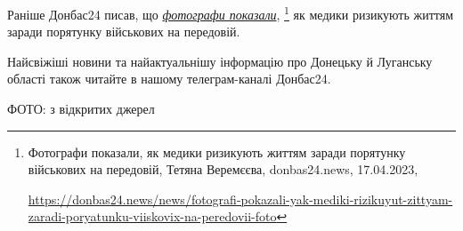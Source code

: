 Раніше Донбас24 писав, що \href{https://donbas24.news/news/fotografi-pokazali-yak-mediki-rizikuyut-zittyam-zaradi-poryatunku-viiskovix-na-peredovii-foto}{\emph{фотографи показали}},%
\footnote{Фотографи показали, як медики ризикують життям заради порятунку військових на передовій, Тетяна Веремєєва, donbas24.news, 17.04.2023, \par\url{https://donbas24.news/news/fotografi-pokazali-yak-mediki-rizikuyut-zittyam-zaradi-poryatunku-viiskovix-na-peredovii-foto}}
як медики ризикують життям заради порятунку військових на передовій.

Найсвіжіші новини та найактуальнішу інформацію про Донецьку й Луганську області
також читайте в нашому телеграм-каналі Донбас24.

ФОТО: з відкритих джерел

